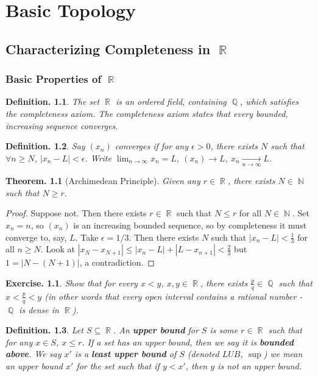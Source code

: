 \documentclass[11pt, a4paper]{memoir}
\DeclareMathOperator{\N}{{\mathbb{N}}}
\DeclareMathOperator{\Q}{{\mathbb{Q}}}
\DeclareMathOperator{\R}{{\mathbb{R}}}
\theoremstyle{change}
\newtheorem{theorem}{Theorem.}[section]
\theoremstyle{plain}
\theoremstyle{nonumberplain}
\newtheorem{definition}{Definition.}
\newtheorem{exercise}{Exercise.}
\newtheorem{proof}{Proof}
\numberwithin{equation}{section}
\begin{document}
\chapter{Basic Topology}
\section{Characterizing Completeness in \texorpdfstring{$\R$}{R}}
\subsection{Basic Properties of $\R$}
\begin{definition}
    The set $\R$ is an ordered field, containing $\Q$, which satisfies the completeness axiom. The completeness axiom states
    that every bounded, increasing sequence converges.
\end{definition}
\begin{definition}
    Say $(x_n)$ converges if for any $\epsilon>0$, there exists $N$ such that $\forall n\geq N$, $|x_n-L|<\epsilon$.
    Write $\lim_{n\to\infty}x_n=L$, $(x_n)\to L$, $x_n\underset{n\to\infty}{\to}L$.
\end{definition}
\begin{theorem}[Archimedean Principle]
    Given any $r\in\R$, there exists $N\in\N$ such that $N\geq r$.
\end{theorem}
\begin{proof}
    Suppose not. Then there exists $r\in\R$ such that $N\leq r$ for all $N\in\N$. Set $x_n=n$, so $(x_n)$ is an increasing
    bounded sequence, so by completeness it must converge to, say, $L$. Take $\epsilon=1/3$. Then there exists $N$ such that
    $|x_n-L|<\frac{1}{3}$ for all $n\geq N$. Look at $|x_N-x_{N+1}|\leq|x_n-L|+|L-x_{n+1}|<\frac{2}{3}$ but $1=|N-(N+1)|$,
    a contradiction.
\end{proof}
\begin{exercise}
    Show that for every $x<y$, $x,y\in\R$, there exists $\frac{p}{q}\in\Q$ such that $x<\frac{p}{q}<y$ (in other words that
    every open interval contains a rational number - $\Q$ is dense in $\R$).
\end{exercise}
\begin{definition}
    Let $S\subseteq\R$. An \textbf{upper bound} for $S$ is some $r\in\R$ such that for any $x\in S$, $x\leq r$. If a set has an upper bound,
    then we say it is \textbf{bounded above}. We say $x'$ is a \textbf{least upper bound} of $S$ (denoted $LUB$, $\sup$)
    we mean an upper bound $x'$ for the set such that if $y<x'$, then $y$ is not an upper bound.
\end{definition}
\end{document}
